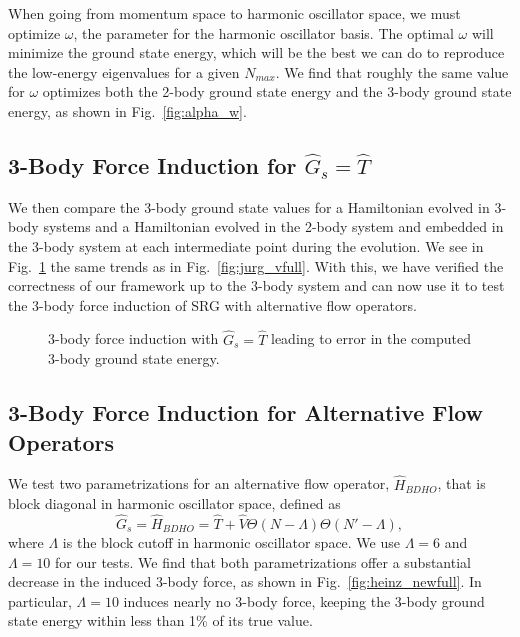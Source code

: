 When going from momentum space to harmonic oscillator space, we must optimize $\omega$, the parameter for the harmonic oscillator basis. The optimal $\omega$ will minimize the ground state energy, which will be the best we can do to reproduce the low-energy eigenvalues for a given $N_{max}$. We find that roughly the same value for $\omega$ optimizes both the 2-body ground state energy and the 3-body ground state energy, as shown in Fig.~\ref{fig:alpha_w}.


\subsection{3-Body Force Induction for $\hat{G}_s=\hat{T}$}

We then compare the 3-body ground state values for a Hamiltonian evolved in 3-body systems and a Hamiltonian evolved in the 2-body system and embedded in the 3-body system at each intermediate point during the evolution. We see in Fig.~\ref{fig:heinz_vfull} the same trends as in Fig.~\ref{fig:jurg_vfull}. With this, we have verified the correctness of our framework up to the 3-body system and can now use it to test the 3-body force induction of SRG with alternative flow operators.

\begin{figure}[t]
\begin{center}
\end{center}
\caption{3-body force induction with $\hat{G}_s=\hat{T}$ leading to error in the computed 3-body ground state energy.}
\label{fig:heinz_vfull}
\end{figure}

\subsection{3-Body Force Induction for Alternative Flow Operators}

We test two parametrizations for an alternative flow operator, $\hat{H}_{BDHO}$, that is block diagonal in harmonic oscillator space, defined as
\begin{equation}
\hat{G}_s = \hat{H}_{BDHO} = \hat{T} + \hat{V} \Theta(N - \Lambda) \Theta(N' - \Lambda),
\end{equation}
where $\Lambda$ is the block cutoff in harmonic oscillator space. We use $\Lambda=6$ and $\Lambda=10$ for our tests. We find that both parametrizations offer a substantial decrease in the induced 3-body force, as shown in Fig.~\ref{fig:heinz_newfull}. In particular, $\Lambda=10$ induces nearly no 3-body force, keeping the 3-body ground state energy within less than 1\% of its true value.

